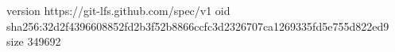 version https://git-lfs.github.com/spec/v1
oid sha256:32d2f4396608852fd2b3f52b8866ccfc3d2326707ca1269335fd5e755d822ed9
size 349692
